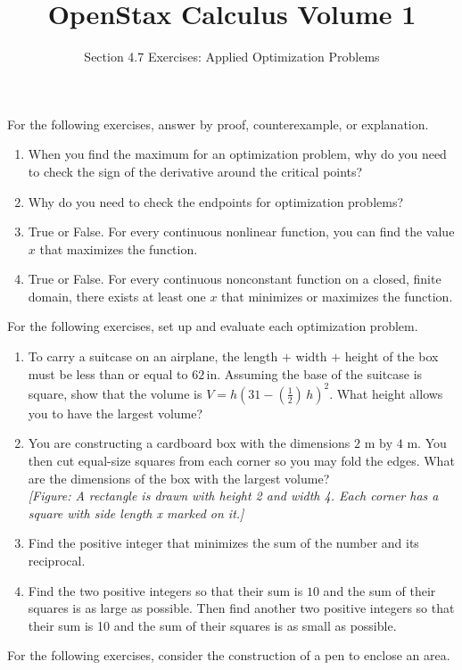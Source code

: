 \documentclass{exercises}
\title{OpenStax Calculus Volume 1}
\subtitle{Section 4.7 Exercises: Applied Optimization Problems}
\author{}
\date{}
\begin{document}
\maketitle


For the following exercises, answer by proof, counterexample, or explanation.

\begin{enumerate}[start=1]
\item When you find the maximum for an optimization problem, why do you need to check the sign of the derivative around the critical points?
\item Why do you need to check the endpoints for optimization problems?
\item True or False. For every continuous nonlinear function, you can find the value $x$ that maximizes the function.
\item True or False. For every continuous nonconstant function on a closed, finite domain, there exists at least one $x$ that minimizes or maximizes the function.
\end{enumerate}

For the following exercises, set up and evaluate each optimization problem.

\begin{enumerate}[resume]
\item To carry a suitcase on an airplane, the length $+$ width $+$ height of the box must be less than or equal to $62\,\text{in}$. Assuming the base of the suitcase is square, show that the volume is $V=h{(31-(\frac{1}{2})\,h)}^{2}$. What height allows you to have the largest volume?
\item You are constructing a cardboard box with the dimensions $\text{2 m by 4 m}$. You then cut equal-size squares from each corner so you may fold the edges. What are the dimensions of the box with the largest volume? \\ \textit{[Figure: A rectangle is drawn with height 2 and width 4. Each corner has a square with side length x marked on it.]}
\item Find the positive integer that minimizes the sum of the number and its reciprocal.
\item Find the two positive integers so that their sum is $10$ and the sum of their squares is as large as possible. Then find another two positive integers so that their sum is 10 and the sum of their squares is as small as possible.
\end{enumerate}

For the following exercises, consider the construction of a pen to enclose an area.
\end{document}
